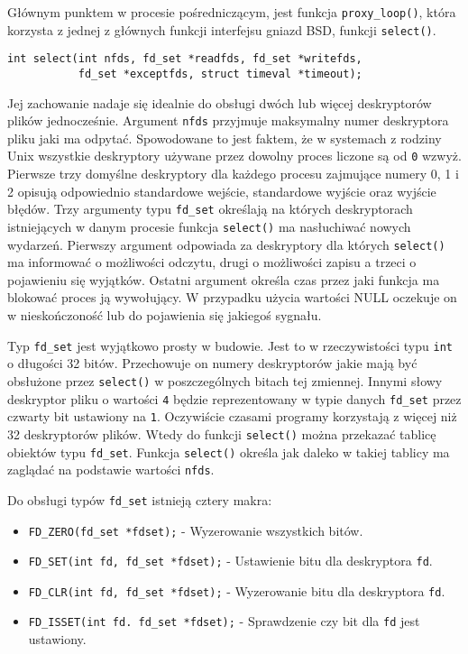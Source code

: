 Głównym punktem w procesie pośredniczącym, jest funkcja
\texttt{proxy\_loop()}, która korzysta z jednej z głównych funkcji
interfejsu gniazd BSD, funkcji \texttt{select()}.

\begin{verbatim}
int select(int nfds, fd_set *readfds, fd_set *writefds,
           fd_set *exceptfds, struct timeval *timeout);
\end{verbatim}

Jej zachowanie nadaje się idealnie do obsługi dwóch lub więcej
deskryptorów plików jednocześnie. Argument \texttt{nfds} przyjmuje
maksymalny numer deskryptora pliku jaki ma odpytać. Spowodowane to jest
faktem, że w systemach z rodziny Unix wszystkie deskryptory używane
przez dowolny proces liczone są od \texttt{0} wzwyż. Pierwsze trzy
domyślne deskryptory dla każdego procesu zajmujące numery 0, 1 i 2
opisują odpowiednio standardowe wejście, standardowe wyjście oraz
wyjście błędów. Trzy argumenty typu \texttt{fd\_set} określają na
których deskryptorach istniejących w danym procesie funkcja
\texttt{select()} ma nasłuchiwać nowych wydarzeń. Pierwszy argument
odpowiada za deskryptory dla których \texttt{select()} ma informować o
możliwości odczytu, drugi o możliwości zapisu a trzeci o pojawieniu się
wyjątków. Ostatni argument określa czas przez jaki funkcja ma blokować
proces ją wywołujący. W przypadku użycia wartości NULL oczekuje on w
nieskończoność lub do pojawienia się jakiegoś sygnału.

Typ \texttt{fd\_set} jest wyjątkowo prosty w budowie. Jest to w
rzeczywistości typu \texttt{int} o długości 32 bitów. Przechowuje on
numery deskryptorów jakie mają być obsłużone przez \texttt{select()} w
poszczególnych bitach tej zmiennej. Innymi słowy deskryptor pliku o
wartości \texttt{4} będzie reprezentowany w typie danych
\texttt{fd\_set} przez czwarty bit ustawiony na \texttt{1}. Oczywiście
czasami programy korzystają z więcej niż 32 deskryptorów plików. Wtedy
do funkcji \texttt{select()} można przekazać tablicę obiektów typu
\texttt{fd\_set}. Funkcja \texttt{select()} określa jak daleko w takiej
tablicy ma zaglądać na podstawie wartości \texttt{nfds}.

Do obsługi typów \texttt{fd\_set} istnieją cztery makra:

\begin{itemize}
\itemsep1pt\parskip0pt
\item
  \texttt{FD\_ZERO(fd\_set *fdset);} - Wyzerowanie wszystkich bitów.
\item
  \texttt{FD\_SET(int fd, fd\_set *fdset);} - Ustawienie bitu dla
  deskryptora \texttt{fd}.
\item
  \texttt{FD\_CLR(int fd, fd\_set *fdset);} - Wyzerowanie bitu dla
  deskryptora \texttt{fd}.
\item
  \texttt{FD\_ISSET(int fd. fd\_set *fdset);} - Sprawdzenie czy bit dla
  \texttt{fd} jest ustawiony.
\end{itemize}

